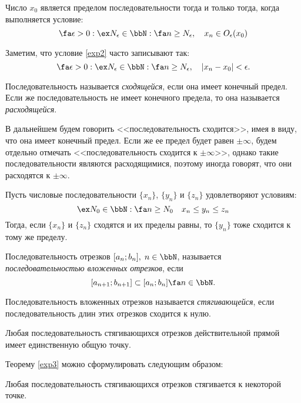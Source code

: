 \begin{lemm}
Число $x_0$ является пределом последовательности тогда и только тогда, когда выполняется условие:
\begin{equation}
\label{exp2}
\fa \epsilon>0: \ex N_\epsilon \in \bbN: \fa n \ge N_\epsilon,\quad x_n \in O_\epsilon(x_0)
\end{equation}
\end{lemm}
Заметим, что условие \eqref{exp2} часто записывают так:
$$
\fa \epsilon>0: \ex N_\epsilon \in \bbN: \fa n \ge N_\epsilon,\quad |x_n-x_0|<\epsilon.
$$
\begin{defn}
Последовательность называется \textit{сходящейся}, если она имеет конечный предел. Если же последовательность не имеет конечного предела, то она называется \textit{расходящейся}.
\end{defn}
В дальнейшем будем говорить <<последовательность сходится>>, имея в виду, что она имеет конечный предел. Если же ее предел будет равен $\pm\infty$, будем отдельно отмечать <<последовательность сходится к $\pm\infty$>>, однако такие последовательности являются расходящимися, поэтому иногда говорят, что они расходятся к $\pm\infty$. 
\begin{thm} \label{exp10}  
Пусть числовые последовательности $\{x_n\}$, $\{y_n\}$ и $\{z_n\}$ удовлетворяют условиям:
$$
\ex N_0 \in \bbN:\fa n\ge N_0 \quad x_n \le y_n \le z_n 
$$
Тогда, если $\{x_n\}$ и $\{z_n\}$ сходятся и их пределы равны, то $\{y_n\}$ тоже сходится к тому же пределу.
\end{thm}

\begin{defn}
Последовательность отрезков $[a_n;b_n],\; n \in \bbN$, называется \textit{последовательностью вложенных отрезков}, если
$$
	[a_{n+1};b_{n+1}]\subset [a_n;b_n] \fa n \in \bbN.
$$
\end{defn}

\begin{defn}
Последовательность вложенных отрезков называется \textit{стягивающейся}, если последовательность длин этих отрезков сходится к нулю.
\end{defn}

\begin{thm}
\label{exp3}
Любая последовательность стягивающихся отрезков действительной прямой имеет единственную общую точку.
\end{thm}

Теорему \ref{exp3} можно сформулировать следующим образом: 
\begin{thmn}
Любая последовательность стягивающихся отрезков стягивается к некоторой точке.
\end{thmn}

